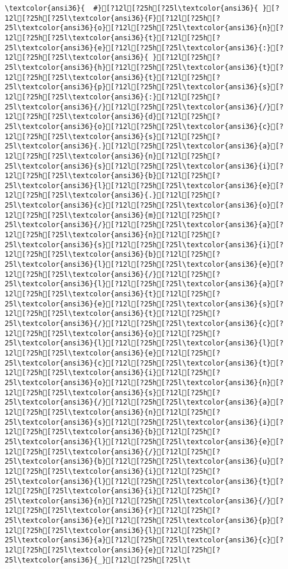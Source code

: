 \documentclass{scrartcl}
\begin{document}
\begin{Verbatim}
\textcolor{ansi36}{  #}[?12l[?25h[?25l\textcolor{ansi36}{ }[?12l[?25h[?25l\textcolor{ansi36}{F}[?12l[?25h[?25l\textcolor{ansi36}{o}[?12l[?25h[?25l\textcolor{ansi36}{n}[?12l[?25h[?25l\textcolor{ansi36}{t}[?12l[?25h[?25l\textcolor{ansi36}{e}[?12l[?25h[?25l\textcolor{ansi36}{:}[?12l[?25h[?25l\textcolor{ansi36}{ }[?12l[?25h[?25l\textcolor{ansi36}{h}[?12l[?25h[?25l\textcolor{ansi36}{t}[?12l[?25h[?25l\textcolor{ansi36}{t}[?12l[?25h[?25l\textcolor{ansi36}{p}[?12l[?25h[?25l\textcolor{ansi36}{s}[?12l[?25h[?25l\textcolor{ansi36}{:}[?12l[?25h[?25l\textcolor{ansi36}{/}[?12l[?25h[?25l\textcolor{ansi36}{/}[?12l[?25h[?25l\textcolor{ansi36}{d}[?12l[?25h[?25l\textcolor{ansi36}{o}[?12l[?25h[?25l\textcolor{ansi36}{c}[?12l[?25h[?25l\textcolor{ansi36}{s}[?12l[?25h[?25l\textcolor{ansi36}{.}[?12l[?25h[?25l\textcolor{ansi36}{a}[?12l[?25h[?25l\textcolor{ansi36}{n}[?12l[?25h[?25l\textcolor{ansi36}{s}[?12l[?25h[?25l\textcolor{ansi36}{i}[?12l[?25h[?25l\textcolor{ansi36}{b}[?12l[?25h[?25l\textcolor{ansi36}{l}[?12l[?25h[?25l\textcolor{ansi36}{e}[?12l[?25h[?25l\textcolor{ansi36}{.}[?12l[?25h[?25l\textcolor{ansi36}{c}[?12l[?25h[?25l\textcolor{ansi36}{o}[?12l[?25h[?25l\textcolor{ansi36}{m}[?12l[?25h[?25l\textcolor{ansi36}{/}[?12l[?25h[?25l\textcolor{ansi36}{a}[?12l[?25h[?25l\textcolor{ansi36}{n}[?12l[?25h[?25l\textcolor{ansi36}{s}[?12l[?25h[?25l\textcolor{ansi36}{i}[?12l[?25h[?25l\textcolor{ansi36}{b}[?12l[?25h[?25l\textcolor{ansi36}{l}[?12l[?25h[?25l\textcolor{ansi36}{e}[?12l[?25h[?25l\textcolor{ansi36}{/}[?12l[?25h[?25l\textcolor{ansi36}{l}[?12l[?25h[?25l\textcolor{ansi36}{a}[?12l[?25h[?25l\textcolor{ansi36}{t}[?12l[?25h[?25l\textcolor{ansi36}{e}[?12l[?25h[?25l\textcolor{ansi36}{s}[?12l[?25h[?25l\textcolor{ansi36}{t}[?12l[?25h[?25l\textcolor{ansi36}{/}[?12l[?25h[?25l\textcolor{ansi36}{c}[?12l[?25h[?25l\textcolor{ansi36}{o}[?12l[?25h[?25l\textcolor{ansi36}{l}[?12l[?25h[?25l\textcolor{ansi36}{l}[?12l[?25h[?25l\textcolor{ansi36}{e}[?12l[?25h[?25l\textcolor{ansi36}{c}[?12l[?25h[?25l\textcolor{ansi36}{t}[?12l[?25h[?25l\textcolor{ansi36}{i}[?12l[?25h[?25l\textcolor{ansi36}{o}[?12l[?25h[?25l\textcolor{ansi36}{n}[?12l[?25h[?25l\textcolor{ansi36}{s}[?12l[?25h[?25l\textcolor{ansi36}{/}[?12l[?25h[?25l\textcolor{ansi36}{a}[?12l[?25h[?25l\textcolor{ansi36}{n}[?12l[?25h[?25l\textcolor{ansi36}{s}[?12l[?25h[?25l\textcolor{ansi36}{i}[?12l[?25h[?25l\textcolor{ansi36}{b}[?12l[?25h[?25l\textcolor{ansi36}{l}[?12l[?25h[?25l\textcolor{ansi36}{e}[?12l[?25h[?25l\textcolor{ansi36}{/}[?12l[?25h[?25l\textcolor{ansi36}{b}[?12l[?25h[?25l\textcolor{ansi36}{u}[?12l[?25h[?25l\textcolor{ansi36}{i}[?12l[?25h[?25l\textcolor{ansi36}{l}[?12l[?25h[?25l\textcolor{ansi36}{t}[?12l[?25h[?25l\textcolor{ansi36}{i}[?12l[?25h[?25l\textcolor{ansi36}{n}[?12l[?25h[?25l\textcolor{ansi36}{/}[?12l[?25h[?25l\textcolor{ansi36}{r}[?12l[?25h[?25l\textcolor{ansi36}{e}[?12l[?25h[?25l\textcolor{ansi36}{p}[?12l[?25h[?25l\textcolor{ansi36}{l}[?12l[?25h[?25l\textcolor{ansi36}{a}[?12l[?25h[?25l\textcolor{ansi36}{c}[?12l[?25h[?25l\textcolor{ansi36}{e}[?12l[?25h[?25l\textcolor{ansi36}{_}[?12l[?25h[?25l\t
\end{Verbatim}
\end{document}
